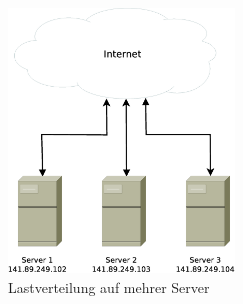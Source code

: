 \documentclass[a4paper, 12pt, BCOR10mm, DIV12, toc=bibliography, toc=listof, german]{scrbook}
\begin{document}
		\begin{figure}
			\centering
			\includegraphics[width=6cm]{images/internet-server}
			\caption{Lastverteilung auf mehrer Server}
			\label{fig:lastverteilung}
		\end{figure}
\end{document}
